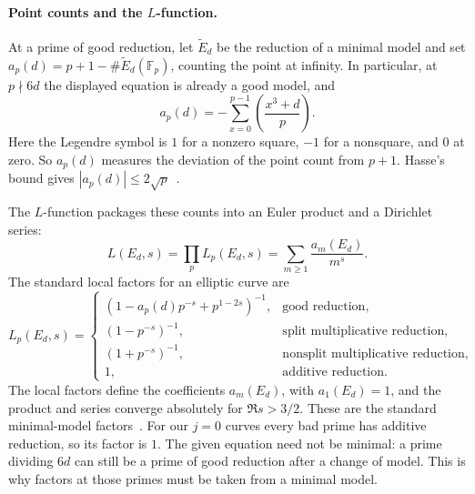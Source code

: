 \documentclass[11pt]{article}
\numberwithin{equation}{section}
\begin{document}
\paragraph{Point counts and the $L$-function.}
At a prime of good reduction, let $\widetilde E_d$ be the reduction of a minimal model and set
$a_p(d)=p+1-\#\widetilde E_d(\mathbb F_p)$, counting the point at infinity.
In particular, at $p\nmid6d$ the displayed equation is already a good model, and
\begin{equation}\label{eq:intro-ap}
 a_p(d)=-\sum_{x=0}^{p-1}\left(\frac{x^3+d}{p}\right).
\end{equation}
Here the Legendre symbol is $1$ for a nonzero square, $-1$ for a nonsquare, and $0$ at zero.
So $a_p(d)$ measures the deviation of the point count from $p+1$.
Hasse's bound gives $|a_p(d)|\le2\sqrt p$~\cite{Has36,SilAEC}.

The $L$-function packages these counts into an Euler product and a Dirichlet series:
\begin{equation}\label{eq:intro-L}
 L(E_d,s)=\prod_p L_p(E_d,s)=\sum_{m\ge1}\frac{a_m(E_d)}{m^s}.
\end{equation}
The standard local factors for an elliptic curve are
\begin{equation}\label{eq:intro-local}
 L_p(E_d,s)=
 \begin{cases}
  (1-a_p(d)p^{-s}+p^{1-2s})^{-1},&\text{good reduction},\\
  (1-p^{-s})^{-1},&\text{split multiplicative reduction},\\
  (1+p^{-s})^{-1},&\text{nonsplit multiplicative reduction},\\
  1,&\text{additive reduction}.
 \end{cases}
\end{equation}
The local factors define the coefficients $a_m(E_d)$, with $a_1(E_d)=1$, and the product and series
converge absolutely for $\Re s>3/2$. These are the standard minimal-model factors~\cite[Appendix~C, \S16]{SilAEC}.
For our $j=0$ curves every bad prime has additive reduction, so its factor is $1$.
The given equation need not be minimal: a prime dividing $6d$ can still be a prime of good reduction
after a change of model. This is why factors at those primes must be taken from a minimal model.
\end{document}
